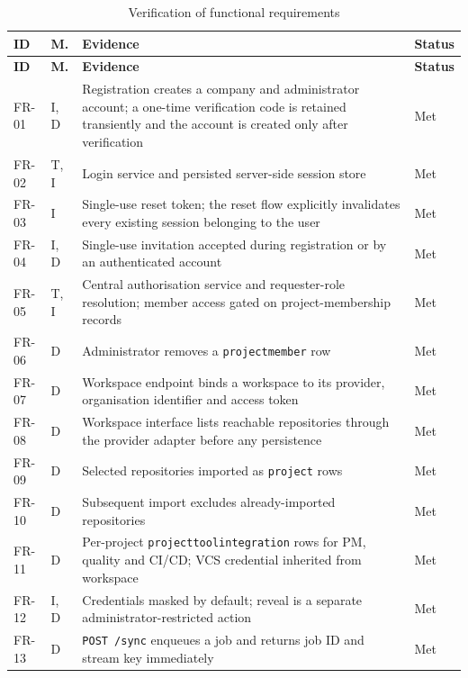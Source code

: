 \begin{longtable}{
  >{\raggedright\arraybackslash}p{}
  >{\raggedright\arraybackslash}p{}
  >{\raggedright\arraybackslash}p{}
  >{\raggedright\arraybackslash}p{}
}
\caption{Verification of functional requirements}
\label{tab:fr-verification}\\
\toprule
\textbf{ID} & \textbf{M.} & \textbf{Evidence} & \textbf{Status} \\
\midrule
\endfirsthead
\toprule
\textbf{ID} & \textbf{M.} & \textbf{Evidence} & \textbf{Status} \\
\midrule
\endhead
\bottomrule
\endlastfoot
FR-01 & I, D & Registration creates a company and administrator account; a
one-time verification code is retained transiently and the account is created
only after verification & Met \\
FR-02 & T, I & Login service and persisted server-side session store & Met \\
FR-03 & I & Single-use reset token; the reset flow explicitly invalidates every
existing session belonging to the user & Met \\
FR-04 & I, D & Single-use invitation accepted during registration or by an
authenticated account & Met \\
FR-05 & T, I & Central authorisation service and requester-role resolution;
member access gated on project-membership records & Met \\
FR-06 & D & Administrator removes a \texttt{projectmember} row & Met \\
FR-07 & D & Workspace endpoint binds a workspace to its provider, organisation
identifier and access token & Met \\
FR-08 & D & Workspace interface lists reachable repositories through the
provider adapter before any persistence & Met \\
FR-09 & D & Selected repositories imported as \texttt{project} rows & Met \\
FR-10 & D & Subsequent import excludes already-imported repositories & Met \\
FR-11 & D & Per-project \texttt{projecttoolintegration} rows for PM, quality and
CI/CD; VCS credential inherited from workspace & Met \\
FR-12 & I, D & Credentials masked by default; reveal is a separate
administrator-restricted action & Met \\
FR-13 & D & \texttt{POST /sync} enqueues a job and returns job ID and stream key
immediately & Met \\

\end{longtable}

